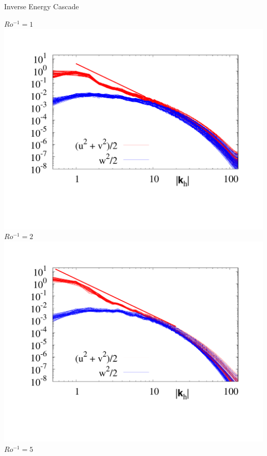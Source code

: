 \documentclass{beamer}
\begin{document}
\begin{frame}{Inverse Energy Cascade}

%
        \centering
        $Ro^{-1} = 1$
        \includegraphics[width=\textwidth]{images/Om1Spec.pdf}
    \emp
        \centering
        $Ro^{-1} = 2$
        \includegraphics[width=\textwidth]{images/Om2Spec.pdf}
    \emp
        \centering
        $Ro^{-1} = 5$

\end{frame}
\end{document}
